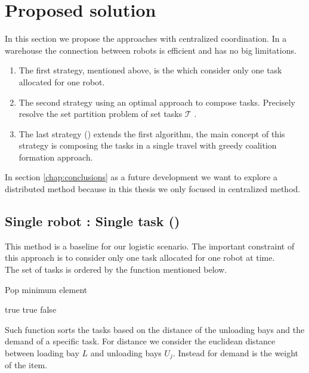 \newpage
\section{Proposed solution} \label{solution}

In this section we propose the approaches with centralized coordination.
In a warehouse the connection between robots is efficient and has no big limitations.
\begin{enumerate}
  \item The first strategy, mentioned above, is the \srst which consider only 
  one task allocated for one robot.

  \item The second strategy \sps using an optimal approach
  to compose tasks. Precisely resolve the set partition problem of set tasks $\mathcal{T}$ . 
  
  \item The last strategy (\gsp) extends the first algorithm,
  the main concept of this strategy is composing the tasks in a single travel with greedy coalition formation approach. 
  
\end{enumerate}

In section \ref{chap:conclusions} as a future development we want to explore a distributed 
method because in this thesis we  only focused in centralized method.  

\subsection{Single robot : Single task (\srst)}

This method is a baseline for our logistic scenario.
The important constraint of this approach is to consider only one task allocated for 
one robot at time.
\\
The set of tasks is ordered by the function mentioned below.
\begin{algorithm}
  \caption{Pop minimum element} \label{SP}
  \begin{algorithmic}[1]
    
     true
    \Else
     true
    \EndIf
     false
    \EndIf
    \EndProcedure
  \end{algorithmic}
\end{algorithm}
\newpage
Such function sorts the tasks based on the distance of the unloading bays and the demand of a specific task.
For distance we consider the euclidean distance between loading bay $L$ and unloading bays $U_j$.
Instead for demand is the weight of the item.

